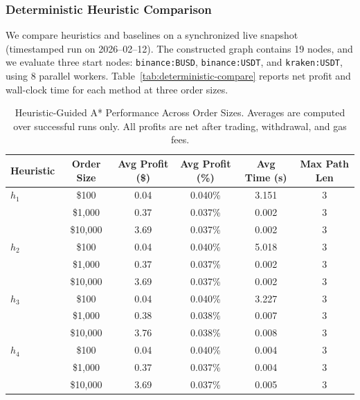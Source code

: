 \subsubsection{Deterministic Heuristic Comparison}
\label{sec:deterministic-compare}

We compare heuristics and baselines on a synchronized live snapshot (timestamped run on 2026--02--12). The constructed graph contains 19 nodes, and we evaluate three start nodes: \texttt{binance:BUSD}, \texttt{binance:USDT}, and \texttt{kraken:USDT}, using 8 parallel workers. Table~\ref{tab:deterministic-compare} reports net profit and wall-clock time for each method at three order sizes.

\begin{table}[h]
\centering
\small
\setlength{\tabcolsep}{6pt}
\caption{Heuristic-Guided A* Performance Across Order Sizes. 
Averages are computed over successful runs only. 
All profits are net after trading, withdrawal, and gas fees.}
\label{tab:heuristic-performance}
\begin{tabular}{lccccc}
\toprule
\textbf{Heuristic} 
& \textbf{Order Size} 
& \textbf{Avg Profit (\$)} 
& \textbf{Avg Profit (\%)} 
& \textbf{Avg Time (s)} 
& \textbf{Max Path Len} \\
\midrule

$h_1$
& \$100     & 0.04  & 0.040\% & 3.151 & 3 \\
& \$1,000   & 0.37  & 0.037\% & 0.002 & 3 \\
& \$10,000  & 3.69  & 0.037\% & 0.002 & 3 \\
\midrule

$h_2$
& \$100     & 0.04  & 0.040\% & 5.018 & 3 \\
& \$1,000   & 0.37  & 0.037\% & 0.002 & 3 \\
& \$10,000  & 3.69  & 0.037\% & 0.002 & 3 \\
\midrule

$h_3$
& \$100     & 0.04  & 0.040\% & 3.227 & 3 \\
& \$1,000   & 0.38  & 0.038\% & 0.007 & 3 \\
& \$10,000  & 3.76  & 0.038\% & 0.008 & 3 \\
\midrule

$h_4$
& \$100     & 0.04  & 0.040\% & 0.004 & 3 \\
& \$1,000   & 0.37  & 0.037\% & 0.004 & 3 \\
& \$10,000  & 3.69  & 0.037\% & 0.005 & 3 \\
\bottomrule
\end{tabular}
\end{table}



